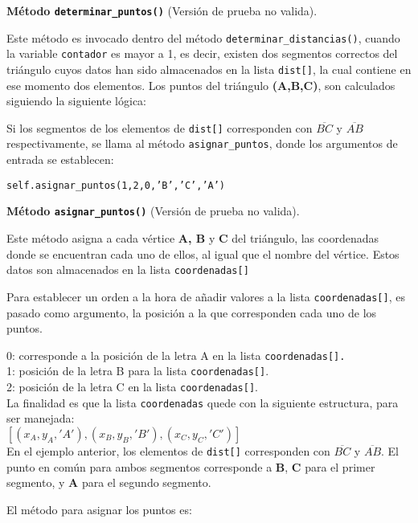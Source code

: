 \textbf{Método \texttt{determinar\_puntos()}} (Versión de prueba no valida).

Este método es invocado dentro del método \texttt{determinar\_distancias()}, cuando la variable \texttt{contador} es mayor a 1, es decir, existen dos segmentos correctos del triángulo cuyos datos han sido almacenados en la lista \texttt{dist[]}, la cual contiene en ese momento dos elementos.
Los puntos del triángulo \textbf{(A,B,C)}, son calculados siguiendo la siguiente lógica:

Si los segmentos de los elementos de \texttt{dist[]} corresponden con $\overline{BC}$ y $\overline{AB}$ respectivamente, se llama al método \texttt{asignar\_puntos}, donde los argumentos de entrada se establecen:

\texttt{self.asignar\_puntos(1,2,0,'B','C','A')}

\textbf{Método \texttt{asignar\_puntos()}} (Versión de prueba no valida).

Este método asigna a cada vértice \textbf{A, B} y \textbf{C} del triángulo, las coordenadas donde se encuentran cada uno de ellos, al igual que el nombre del vértice. Estos datos son almacenados en la lista \texttt{coordenadas[]}

Para establecer un orden a la hora de añadir valores a la lista \texttt{coordenadas[]}, es pasado como argumento, la posición a la que corresponden cada uno de los puntos.

0: corresponde a la posición de la letra A en la lista \texttt{coordenadas[].}\\
1: posición de la letra B para la lista \texttt{coordenadas[]}.\\
2: posición de la letra C en la lista \texttt{coordenadas[]}.\\

La finalidad es que la lista \texttt{coordenadas} quede con la siguiente estructura, para ser manejada:\\

$[(x_{A},y_{A},'A'),(x_{B},y_{B},'B'),(x_{C},y_{C},'C')]$\\

En el ejemplo anterior, los elementos de \texttt{dist[]} corresponden con $\overline{BC}$ y $\overline{AB}$. El punto en común para ambos segmentos corresponde a \textbf{B}, \textbf{C} para el primer segmento, y \textbf{A} para el segundo segmento.

El método para asignar los puntos es:

